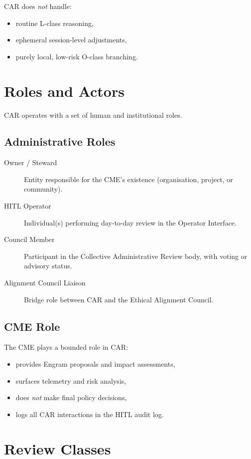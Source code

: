 CAR does \emph{not} handle:
\begin{itemize}
    \item routine L-class reasoning,
    \item ephemeral session-level adjustments,
    \item purely local, low-risk O-class branching.
\end{itemize}

\section{Roles and Actors}

CAR operates with a set of human and institutional roles.

\subsection{Administrative Roles}

\begin{description}
    \item[Owner / Steward] Entity responsible for the CME’s existence
          (organisation, project, or community).
    \item[HITL Operator] Individual(s) performing day-to-day review in the
          Operator Interface.
    \item[Council Member] Participant in the Collective Administrative Review
          body, with voting or advisory status.
    \item[Alignment Council Liaison] Bridge role between CAR and the Ethical
          Alignment Council.
\end{description}

\subsection{CME Role}

The CME plays a bounded role in CAR:
\begin{itemize}
    \item provides Engram proposals and impact assessments,
    \item surfaces telemetry and risk analysis,
    \item does \emph{not} make final policy decisions,
    \item logs all CAR interactions in the HITL audit log.
\end{itemize}

\section{Review Classes}


